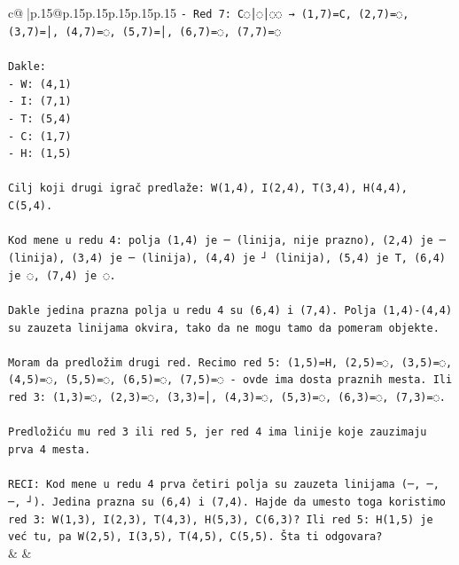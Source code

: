 \documentclass{article}
\begin{document}
{\begin{supertabular}{c@{$\;$}|p{.15\linewidth}@{}p{.15\linewidth}p{.15\linewidth}p{.15\linewidth}p{.15\linewidth}p{.15\linewidth}}
{{{\texttt{{-} Red 7: C◌│◌│◌◌ → (1,7)=C, (2,7)=◌, (3,7)=│, (4,7)=◌, (5,7)=│, (6,7)=◌, (7,7)=◌} \\
\\ 
\texttt{Dakle:} \\
\texttt{{-} W: (4,1)} \\
\texttt{{-} I: (7,1)} \\
\texttt{{-} T: (5,4)} \\
\texttt{{-} C: (1,7)} \\
\texttt{{-} H: (1,5)} \\
\\ 
\texttt{Cilj koji drugi igrač predlaže: W(1,4), I(2,4), T(3,4), H(4,4), C(5,4).} \\
\\ 
\texttt{Kod mene u redu 4: polja (1,4) je ─ (linija, nije prazno), (2,4) je ─ (linija), (3,4) je ─ (linija), (4,4) je ┘ (linija), (5,4) je T, (6,4) je ◌, (7,4) je ◌.} \\
\\ 
\texttt{Dakle jedina prazna polja u redu 4 su (6,4) i (7,4). Polja (1,4){-}(4,4) su zauzeta linijama okvira, tako da ne mogu tamo da pomeram objekte.} \\
\\ 
\texttt{Moram da predložim drugi red. Recimo red 5: (1,5)=H, (2,5)=◌, (3,5)=◌, (4,5)=◌, (5,5)=◌, (6,5)=◌, (7,5)=◌ {-} ovde ima dosta praznih mesta. Ili red 3: (1,3)=◌, (2,3)=◌, (3,3)=│, (4,3)=◌, (5,3)=◌, (6,3)=◌, (7,3)=◌.} \\
\\ 
\texttt{Predložiću mu red 3 ili red 5, jer red 4 ima linije koje zauzimaju prva 4 mesta.} \\
\\ 
\texttt{RECI: Kod mene u redu 4 prva četiri polja su zauzeta linijama (─, ─, ─, ┘). Jedina prazna su (6,4) i (7,4). Hajde da umesto toga koristimo red 3: W(1,3), I(2,3), T(4,3), H(5,3), C(6,3)? Ili red 5: H(1,5) je već tu, pa W(2,5), I(3,5), T(4,5), C(5,5). Šta ti odgovara?} \\
            }
        }
    }
    & & \\ \\


\end{supertabular}}
\end{document}
